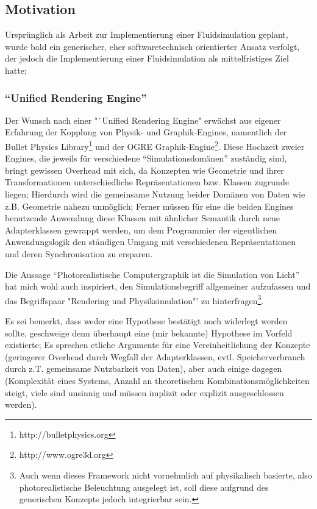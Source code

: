 \subsection{Motivation}

Ursprünglich als Arbeit zur Implementierung einer Fluidsimulation geplant, wurde bald ein generischer, eher softwaretechnisch orientierter Ansatz verfolgt, der jedoch die Implementierung einer Fluidsimulation als mittelfristiges Ziel hatte;\\

\subsubsection{"`Unified Rendering Engine"'}
Der Wunsch nach einer "`Unified Rendering Engine" erwächst aus eigener Erfahrung der Kopplung von Physik- und Graphik-Engines, namentlich der Bullet Physics Library\footnote{http://bulletphysics.org} und der OGRE Graphik-Engine\footnote{http://www.ogre3d.org}. Diese Hochzeit zweier Engines, die jeweils für verschiedene "`Simulationsdomänen"' zuständig sind, bringt gewissen Overhead mit sich, da Konzepten wie  Geometrie und ihrer Transformationen unterschiedliche Repräsentationen bzw. Klassen zugrunde liegen;
Hierdurch wird die gemeinsame Nutzung beider Domänen von Daten wie z.B. Geometrie nahezu unmöglich; Ferner müssen für eine die beiden Engines benutzende Anwendung diese Klassen mit ähnlicher Semantik durch neue Adapterklassen gewrappt werden,
um dem Programmier der eigentlichen Anwendungslogik den ständigen Umgang mit verschiedenen Repräsentationen und deren Synchronisation zu ersparen.\\


Die Aussage "`Photorealistische Computergraphik ist die Simulation von Licht"'  hat mich wohl auch inspiriert, den Simulationsbegriff allgemeiner aufzufassen und das Begriffspaar "Rendering und Physiksimulation"' zu hinterfragen\footnote{Auch wenn dieses Framework nicht vornehmlich auf physikalisch basierte, also photorealistische Beleuchtung ausgelegt ist, soll diese aufgrund des generischen Konzepts jedoch integrierbar sein.}.

Es sei bemerkt, dass weder eine Hypothese bestätigt noch widerlegt werden sollte, geschweige denn überhaupt eine (mir bekannte) Hypothese im Vorfeld existierte; Es sprechen etliche Argumente für eine Vereinheitlichung der Konzepte  (geringerer Overhead durch Wegfall der Adapterklassen, evtl. Speicherverbrauch durch z.T. gemeinsame Nutzbarkeit von Daten), aber auch einige dagegen (Komplexität eines Systems, Anzahl an theoretischen Kombinationsmöglichkeiten steigt, viele sind unsinnig und müssen implizit oder explizit ausgeschlossen werden).\\

